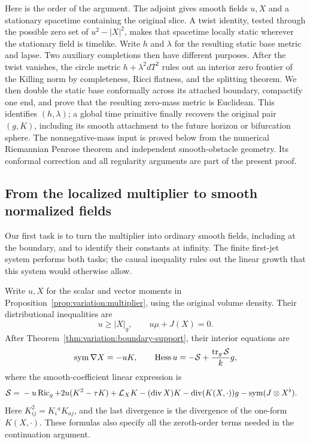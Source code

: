 Here is the order of the argument.  The adjoint gives smooth fields
$u,X$ and a stationary spacetime containing the original slice.  A twist
identity, tested through the possible zero set of $u^2-|X|^2$, makes
that spacetime locally static wherever the stationary field is timelike.
Write $h$ and $\lambda$ for the resulting static base metric and lapse.
Two auxiliary completions then have different purposes.  After the twist vanishes, the circle metric
$h+\lambda^2dT^2$ rules out an interior zero frontier of the Killing
norm by completeness, Ricci flatness, and the splitting theorem.
We then double the static base conformally across its attached
boundary, compactify one end, and prove that the resulting zero-mass
metric is Euclidean.  This identifies $(h,\lambda)$; a global time
primitive finally recovers the original pair $(g,K)$, including its
smooth attachment to the future horizon or bifurcation sphere.
The nonnegative-mass input is proved below from the numerical
Riemannian Penrose theorem and independent smooth-obstacle geometry.
Its conformal correction and all regularity arguments are part of the
present proof.

\subsection{From the localized multiplier to smooth normalized fields}

Our first task is to turn the multiplier into ordinary smooth fields,
including at the boundary, and to identify their constants at infinity.
The finite first-jet system performs both tasks; the causal inequality
rules out the linear growth that this system would otherwise allow.

Write $u,X$ for the scalar and vector moments in
Proposition~\ref{prop:variation:multiplier}, using the original volume
density.  Their distributional inequalities are
\begin{equation}\label{eq:static:complementarity}
 u\geq |X|_g,\qquad u\mu+J(X)=0.
\end{equation}
After Theorem~\ref{thm:variation:boundary-support}, their interior
equations are
\begin{equation}\label{eq:static:adjoint}
 \operatorname{sym}\nabla X=-uK,\qquad
 \operatorname{Hess} u=-\mathcal S+\frac{\operatorname{tr}_g\mathcal S}{k}g,
\end{equation}
where the smooth-coefficient linear expression is
\begin{align}\label{eq:static:S}
 \mathcal S={}&-u\operatorname{Ric}_g+2u(K^2-\tau K)+\mathcal L_XK
 -(\operatorname{div} X)K-\operatorname{div}(K(X,\cdot))g-\operatorname{sym}(J\otimes X^\flat).
\end{align}
Here $K^2_{ij}=K_i{}^aK_{aj}$, and the last divergence is the
divergence of the one-form $K(X,\cdot)$.  These formulas also specify
all the zeroth-order terms needed in the continuation argument.

